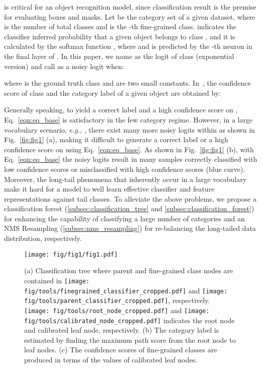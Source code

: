 \documentclass[sigconf]{acmart}
\begin{document}
 is critical for an object recognition model, since classification result is the premise for evaluating boxes and masks. Let  be the category set of a given dataset, where  is the number of total classes and  is the -th fine-grained class.  indicates the classifier inferred probability that a given object belongs to class , and it is calculated by the softmax function , where  and  is predicted by the -th neuron in the final layer of . In this paper, we name  as the logit of class  (exponential version) and call  as a noisy logit when:

\vspace{-2mm}

where  is the ground truth class and  are two small constants. In~\cite{maskrcnn}, the confidence score of class  and the category label  of a given object are obtained by:

\vspace{-2mm}


Generally speaking, to yield a correct label and a high confidence score on , Eq.~\ref{eqn:eq_base} is satisfactory in the few category regime. However, in a large vocabulary scenario, \emph{e.g.,} , there exist many more noisy logits within  as shown in Fig.~\ref{fig:fig1} (a), making it difficult to generate a correct label or a high confidence score on  using Eq.~\ref{eqn:eq_base}. As shown in Fig.~\ref{fig:fig1} (b), with Eq.~\ref{eqn:eq_base} the noisy logits result in many samples correctly classified with low confidence scores or misclassified with high confidence scores (blue curve). Moreover, the long-tail phenomena that inherently occur in a large vocabulary make it hard for a model to well learn effective classifier and feature representations against tail classes. To alleviate the above problems, we propose a classification forest (\cref{subsec:classification_tree} and \cref{subsec:classification_forest}) for enhancing the capability of classifying a large number of categories and an NMS Resampling (\cref{subsec:nms_resampling}) for re-balancing the long-tailed data distribution, respectively.

\begin{figure}
	\centering
	\texttt{[image: fig/fig1/fig1.pdf]}
	\vspace{-6mm}
	\caption{ (a) Classification tree where parent and fine-grained class nodes are contained in \protect\texttt{[image: fig/tools/finegrained\_classifier\_cropped.pdf]} and \protect\texttt{[image: fig/tools/parent\_classifier\_cropped.pdf]}, respectively. \protect\texttt{[image: fig/tools/root\_node\_cropped.pdf]} and \protect\texttt{[image: fig/tools/calibrated\_node\_cropped.pdf]} indicates the root node and calibrated leaf node, respectively.	(b) The category label is estimated by finding the maximum path score from the root node to leaf nodes. (c) The confidence scores of fine-grained classes are produced in terms of the values of calibrated leaf nodes.}
	\label{fig:tree}
\vspace{-4mm}
\end{figure}
\end{document}
